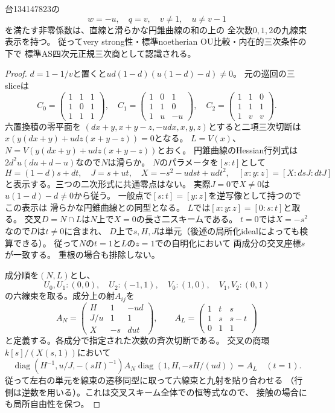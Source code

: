 \begin{theorem}[134147823の最後の曲線表示]
\label{thm:ou-four-zero-last-conic}
台134147823の
\[
 w=-u,\quad q=v,\quad v\ne1,\quad u\ne v-1
\]
を満たす非零係数は、直線と滑らかな円錐曲線の和の上の
全次数$0,1,2$の九線束表示を持つ。
従ってvery strong性・標準noetherian OU比較・内在的三次条件の下で
標準AS四次元正規三次商として認識される。
\end{theorem}
\begin{proof}
$d=1-1/v$と置くと$u d(1-d)(u(1-d)-d)\ne0$。
元の巡回の三sliceは
\[
 C_0=\begin{pmatrix}1&1&1\\1&0&1\\1&1&1\end{pmatrix},
 \quad C_1=\begin{pmatrix}1&0&1\\1&1&0\\1&u&-u\end{pmatrix},
 \quad C_2=\begin{pmatrix}1&1&0\\1&1&1\\1&v&v\end{pmatrix}.
\]
六置換積の零平面を
$(dx+y,x+y-z,-udx,x,y,z)$とすると二項三次切断は
$x(y(dx+y)+ud z(x+y-z))=0$となる。
$L=V(x)$、$N=V(y(dx+y)+ud z(x+y-z))$とおく。
円錐曲線のHessian行列式は$2d^2u(du+d-u)$なので$N$は滑らか。
$N$のパラメータを$[s:t]$として
\[
 H=(1-d)s+dt,\quad J=s+ut,\quad
 X=-s^2-udst+udt^2,\quad
 [x:y:z]=[X:dsJ:dtJ]
\]
と表示する。三つの二次形式に共通零点はない。
実際$J=0$で$X\ne0$は$u(1-d)-d\ne0$から従う。
一般点で$[s:t]=[y:z]$を逆写像として持つのでこの表示は
滑らかな円錐曲線との同型となる。
$L$では$[x:y:z]=[0:s:t]$と取る。
交叉$D=N\cap L$は$N$上で$X=0$の長さ二スキームである。
$t=0$では$X=-s^2$なので$D$は$t\ne0$に含まれ、
$D$上で$s,H,J$は単元（後述の局所化idealによっても検算できる）。
従って$N$の$t=1$と$L$の$z=1$での自明化において
両成分の交叉座標$s$が一致する。
重根の場合も排除しない。

成分順を$(N,L)$とし、
\[
 U_0,U_1:(0,0),\quad U_2:(-1,1),\quad
 V_0:(1,0),\quad V_1,V_2:(0,1)
\]
の六線束を取る。成分上の射$A_{ij}$を
\[
 A_N=\begin{pmatrix}H&1&-ud\\J/u&1&1\\X&-s&dut\end{pmatrix},
 \qquad
 A_L=\begin{pmatrix}1&t&s\\1&s&s-t\\0&1&1\end{pmatrix}
\]
と定義する。各成分で指定された次数の斉次切断である。
交叉の商環$k[s]/(X(s,1))$において
\[
 \operatorname{diag}(H^{-1},u/J,-(sH)^{-1}) A_N
 \operatorname{diag}(1,H,-sH/(ud))=A_L
 \quad(t=1).
\]
従って左右の単元を線束の遷移同型に取って六線束と九射を貼り合わせる
（行側は逆数を用いる）。これは交叉スキーム全体での恒等式なので、
接触の場合にも局所自由性を保つ。


\end{proof}
